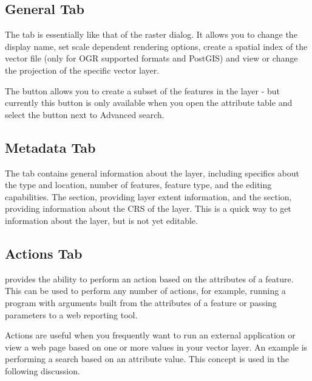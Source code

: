 \subsection{General Tab}\label{vectorgeneraltab}

The  tab is essentially like that of the raster dialog. It
allows you to change the display name, set scale dependent rendering options,
create a spatial index of the vector file (only for OGR supported formats and
PostGIS) and view or change the projection of the specific vector layer.

The  button allows you to create a subset of the
features in the layer - but currently this button is only available when you
open the attribute table and select the  button next to Advanced
search.

\subsection{Metadata Tab}

The  tab contains general information about the layer,
including specifics about the type and location, number of features, feature
type, and the editing capabilities. The  section,
providing
layer extent information, and the 
section, providing information about the CRS of the layer. This is a quick
way to get information about the layer, but is not yet editable.

\subsection{Actions Tab}\label{label_actions}

\qg provides the ability to perform an action based on the attributes of a
feature. This can be used to perform any number of actions, for example,
running a program with arguments built from the attributes of a feature or
passing parameters to a web reporting tool.

Actions are useful when you frequently want to run an external application or
view a web page based on one or more values in your vector layer. An example
is performing a search based on an attribute value. This concept is used in
the following discussion.


